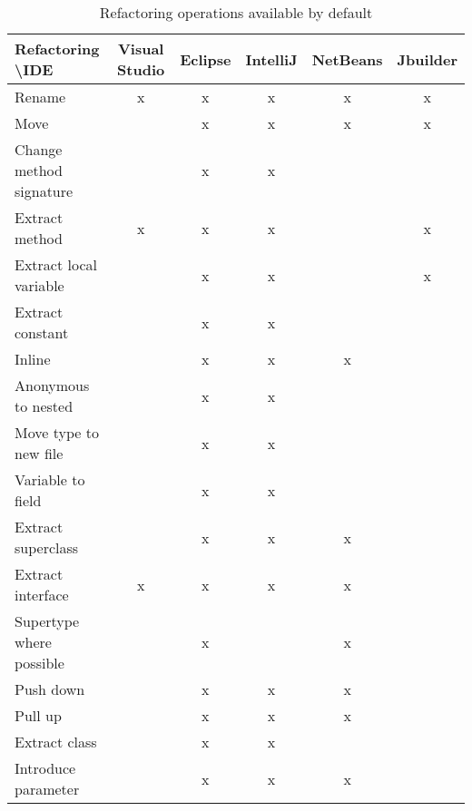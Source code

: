 \begin{table}[htbp]
\caption{Refactoring operations available by default}
\label{tab-Comparing-Static}
\begin{tabular}{|l|c|c|c|c|c|}
\hline
Refactoring \textbackslash IDE           & Visual Studio & Eclipse & IntelliJ & NetBeans & Jbuilder \\ \hline
Rename                    & x             & x       & x        & x        & x        \\ \hline
Move                      &               & x       & x        & x        & x        \\ \hline
Change method signature   &               & x       & x        &          &          \\ \hline
Extract method            & x             & x       & x        &          & x        \\ \hline
Extract local variable    &               & x       & x        &          & x        \\ \hline
Extract constant          &               & x       & x        &          &          \\ \hline
Inline                    &               & x       & x        & x        &          \\ \hline
Anonymous to nested       &               & x       & x        &          &          \\ \hline
Move type to new file     &               & x       & x        &          &          \\ \hline
Variable to field         &               & x       & x        &          &          \\ \hline
Extract superclass        &               & x       & x        & x        &          \\ \hline
Extract interface         & x             & x       & x        & x        &          \\ \hline
Supertype where possible  &               & x       &          & x        &          \\ \hline
Push down                 &               & x       & x        & x        &          \\ \hline
Pull up                   &               & x       & x        & x        &          \\ \hline
Extract class             &               & x       & x        &          &          \\ \hline
Introduce parameter       &               & x       & x        & x        &          \\ \hline

\end{tabular}
\end{table}
